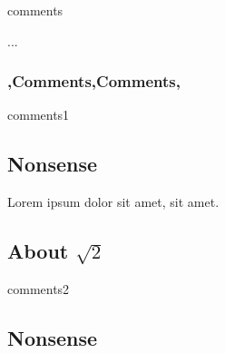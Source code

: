 \copyrightVincent


	\begin{saveblock}{comments}
		\begin{highlightblock}[linewidth=0.9\textwidth,gobble=8]
			\let\UL\ul
			\makeatletter
			\renewcommand\ul{
				\let\set@color\beamerorig@set@color
				\let\reset@color\beamerorig@reset@color
				\UL
			}
			...
		\end{highlightblock}
	\end{saveblock}

	\begin{frame}
		\frametitle{\lang,Comments,Comments,}

	\end{frame}

\endDetail

\begin{saveblock}{comments1}
	\begin{highlightblock}[linewidth=0.6\textwidth,gobble=8]
		\section{Nonsense}

		Lorem ipsum dolor sit amet,
		 sit amet.

		\subsection{About $\sqrt{2}$}
	\end{highlightblock}
\end{saveblock}

\begin{saveblock}{comments2}
	\begin{highlightblock}[linewidth=0.6\textwidth,gobble=8]
		\section{Nonsense}

	\end{highlightblock}
\end{saveblock}

